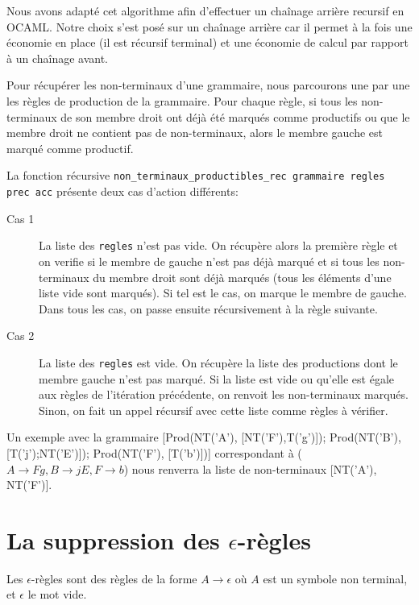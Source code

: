 \documentclass[11pt,a4paper]{article}
\def\code#1{\texttt{#1}} %
\begin{document}
Nous avons adapté cet algorithme afin d'effectuer un chaînage arrière recursif en OCAML. Notre choix s'est posé sur un chaînage arrière car il permet à la fois une économie en place (il est récursif terminal) et une économie de calcul par rapport à un chaînage avant.
\newline

Pour récupérer les non-terminaux d'une grammaire, nous parcourons une par une les règles
de production de la grammaire. Pour chaque règle, si tous les non-terminaux de son membre droit ont déjà  été marqués comme productifs ou que le membre droit ne contient pas de non-terminaux, alors le membre gauche est marqué comme productif.

La fonction récursive \code{non\_terminaux\_productibles\_rec grammaire regles prec acc} présente deux cas d'action différents:

\begin{description}
    \item[Cas 1] La liste des \code{regles} n'est pas vide. On récupère alors la première règle et on verifie si le membre de gauche n'est pas déjà marqué et si tous les non-terminaux du membre droit sont déjà marqués (tous les éléments d'une liste vide sont marqués). Si tel est le cas, on marque le membre de gauche. Dans tous les cas, on passe ensuite récursivement à la règle suivante.
    \item[Cas 2] La liste des \code{regles} est vide. On récupère la liste des productions dont le membre gauche n'est pas marqué. Si la liste est vide ou qu'elle est égale aux règles de l'itération précédente, on renvoit les non-terminaux marqués. Sinon, on fait un appel récursif avec cette liste comme règles à vérifier.
\end{description}

Un exemple avec la grammaire
[Prod(NT('A'), [NT('F'),T('g')]);
 Prod(NT('B'), [T('j');NT('E')]);
 Prod(NT('F'), [T('b')])]
correspondant à ($A \rightarrow Fg, B \rightarrow jE, F \rightarrow b$) nous renverra la liste de non-terminaux [NT('A'), NT('F')].

\newpage


\section{La suppression des $\epsilon$-règles}

Les $\epsilon$-règles sont des règles de la forme
$A \rightarrow \epsilon$ où $A$ est un symbole non
terminal, et $\epsilon$ le mot vide.
\end{document}
